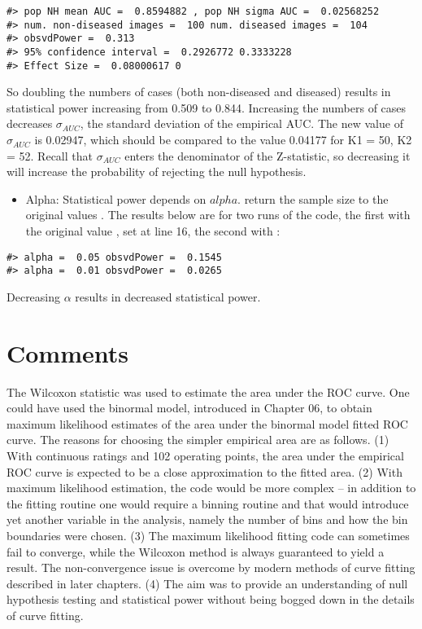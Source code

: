 \documentclass[
]{book}
\providecommand{\tightlist}{%
  \setlength{\itemsep}{0pt}\setlength{\parskip}{0pt}}
\begin{document}
\begin{verbatim}
#> pop NH mean AUC =  0.8594882 , pop NH sigma AUC =  0.02568252
#> num. non-diseased images =  100 num. diseased images =  104
#> obsvdPower =  0.313
#> 95% confidence interval =  0.2926772 0.3333228
#> Effect Size =  0.08000617 0
\end{verbatim}

So doubling the numbers of cases (both non-diseased and diseased) results in statistical power increasing from 0.509 to 0.844. Increasing the numbers of cases decreases \(\sigma_{AUC}\), the standard deviation of the empirical AUC. The new value of \(\sigma_{AUC}\) is 0.02947, which should be compared to the value 0.04177 for K1 = 50, K2 = 52. Recall that \(\sigma_{AUC}\) enters the denominator of the Z-statistic, so decreasing it will increase the probability of rejecting the null hypothesis.

\begin{itemize}
\tightlist
\item
  Alpha: Statistical power depends on \(alpha\). return the sample size to the original values . The results below are for two runs of the code, the first with the original value , set at line 16, the second with :
\end{itemize}

\begin{verbatim}
#> alpha =  0.05 obsvdPower =  0.1545 
#> alpha =  0.01 obsvdPower =  0.0265
\end{verbatim}

Decreasing \(\alpha\) results in decreased statistical power.

\hypertarget{comments}{%
\section{Comments}\label{comments}}

The Wilcoxon statistic was used to estimate the area under the ROC curve. One could have used the binormal model, introduced in Chapter 06, to obtain maximum likelihood estimates of the area under the binormal model fitted ROC curve. The reasons for choosing the simpler empirical area are as follows. (1) With continuous ratings and 102 operating points, the area under the empirical ROC curve is expected to be a close approximation to the fitted area. (2) With maximum likelihood estimation, the code would be more complex -- in addition to the fitting routine one would require a binning routine and that would introduce yet another variable in the analysis, namely the number of bins and how the bin boundaries were chosen. (3) The maximum likelihood fitting code can sometimes fail to converge, while the Wilcoxon method is always guaranteed to yield a result. The non-convergence issue is overcome by modern methods of curve fitting described in later chapters. (4) The aim was to provide an understanding of null hypothesis testing and statistical power without being bogged down in the details of curve fitting.
\end{document}
